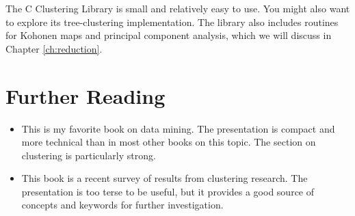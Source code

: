 The C Clustering Library is small and relatively easy to use.  You
might also want to explore its tree-clustering implementation.  The
library also includes routines for Kohonen maps and principal
component analysis, which we will discuss in Chapter
\ref{ch:reduction}.
  

\section{Further Reading}
\begin{itemize}
\item {}
  This is my favorite book on data mining. The presentation is compact
  and more technical than in most other books on this topic.  The
  section on clustering is particularly strong.

\item {}
  This book is a recent survey of results from clustering research.
  The presentation is too terse to be useful, but it provides a good
  source of concepts and keywords for further investigation.

%



\end{itemize}
